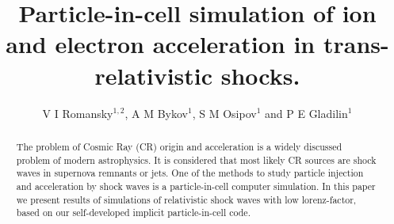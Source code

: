 \documentclass[a4paper]{jpconf}
\begin{document}
\title{Particle-in-cell simulation of ion and electron acceleration in trans-relativistic shocks.}

\author{V I Romansky$^{1,2}$, A M Bykov$^1$, S M Osipov$^1$ and P E Gladilin$^1$}

\address{$^1$ Ioffe Institute, 26 Politekhnicheskaya st., St. Petersburg 194021, Russia}
\address{$^2$ 
Sternberg Astronomical Institute, Moscow State University
 Universitetsky pr., 13, Moscow 119234, Russia}


\begin{abstract}
The problem of Cosmic Ray (CR) origin and acceleration is a widely discussed problem of
modern astrophysics. It is considered that most likely CR sources are 
shock waves in supernova remnants or jets. One of the methods to study particle injection and acceleration by shock
waves is a particle-in-cell computer simulation. In this paper we present results of
simulations of relativistic shock waves with low lorenz-factor, based on our self-developed implicit particle-in-cell code. 
\end{abstract}




\end{document}
